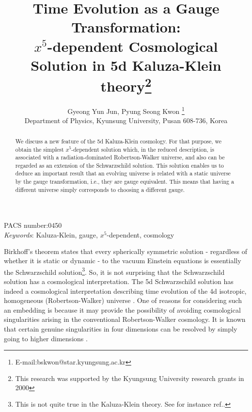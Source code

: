 \documentclass[a4paper,12pt]{article}
\begin{document}
\pagestyle{plain}
\title{Time Evolution as a Gauge Transformation: \\
$x^5$-dependent Cosmological Solution in 5d Kaluza-Klein
theory\footnote{This research was supported by the Kyungsung
University research grants in 2000}}
\author{Gyeong Yun Jun, Pyung Seong Kwon
\footnote{E-mail:bskwon@star.kyungsung.ac.kr}\\
{\small Department of Physics, Kyunsung University, Pusan 608-736,
Korea}}
\date{}
\maketitle
\thispagestyle{empty}
\begin{abstract}
We discuss a new feature of the 5d Kaluza-Klein cosmology. For
that purpose, we obtain the simplest $x^5$-dependent solution
which, in the reduced description, is associated with a
radiation-dominated Robertson-Walker universe, and also can be
regarded as an extension of the Schwarzschild solution. This
solution enables us to deduce an important result that an evolving
universe is related with a static universe by the gauge
transformation, i.e., they are gauge equivalent. This means that
having a different universe simply corresponds to choosing a
different gauge.
\end{abstract}
\medskip
\begin{center}
{PACS number:0450}\\
\medskip
{\em Keywords}: Kaluza-Klein, gauge, $x^5$-dependent, cosmology
\end{center}
\newpage
\baselineskip 8.5mm

\setcounter{page}{1}
 Birkhoff's theorem states that every spherically symmetric
 solution - regardless of whether it is static or dynamic - to the
 vacuum Einstein equations is essentially the Schwarzschild
 solution\footnote{This is not quite true in the Kaluza-Klein
 theory. See for instance ref.\cite{gro}.}. So, it is not 
surprising that
 the Schwarzschild solution has a cosmological interpretation. The
 5d Schwarzschild  solution has indeed a
 cosmological interpretation describing time evolution of the 4d
 isotropic, homogeneous (Robertson-Walker) universe \cite{beh}.
 One of reasons for considering such an embedding is
because it may provide the possibility of avoiding cosmological
singularities arising in the conventional Robertson-Walker
cosmology. It is known that certain genuine singularities in four
dimensions can be resolved by simply going to higher dimensions
\cite{gib}.
\end{document}
